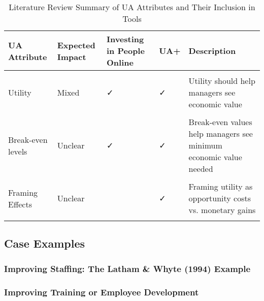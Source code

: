 \documentclass[
]{article}
\begin{document}
\begin{table}[!h]
\centering
\caption{\label{tab:literature-table}Literature Review Summary of UA Attributes and Their Inclusion in Tools}
\centering
\begin{tabular}[t]{lllll}
\toprule
UA Attribute & Expected Impact & Investing in People Online & UA+ & Description\\
\midrule
\cellcolor{gray!10}{Validity} & \cellcolor{gray!10}{Positive but weak} & \cellcolor{gray!10}{✓} & \cellcolor{gray!10}{✓} & \cellcolor{gray!10}{Validity should help managers see that practices work as claimed}\\
Utility & Mixed & ✓ & ✓ & Utility should help managers see economic value\\
\cellcolor{gray!10}{SDy} & \cellcolor{gray!10}{Mixed} & \cellcolor{gray!10}{✓} & \cellcolor{gray!10}{✓} & \cellcolor{gray!10}{SDy helps managers appreciate economic value of performance}\\
Break-even levels & Unclear & ✓ & ✓ & Break-even values help managers see minimum economic value needed\\
\cellcolor{gray!10}{Expectancy Charts} & \cellcolor{gray!10}{Mixed} & \cellcolor{gray!10}{} & \cellcolor{gray!10}{✓} & \cellcolor{gray!10}{Expectancy charts help managers see validity-probability relationships}\\
\addlinespace
Framing Effects & Unclear &  & ✓ & Framing utility as opportunity costs vs. monetary gains\\
\cellcolor{gray!10}{Plain-Text Descriptions} & \cellcolor{gray!10}{Positive} & \cellcolor{gray!10}{} & \cellcolor{gray!10}{✓} & \cellcolor{gray!10}{Plain-text descriptions improve comprehension}\\
\bottomrule
\end{tabular}
\end{table}

\subsection{Case Examples}\label{case-examples}

\subsubsection{Improving Staffing: The Latham \& Whyte (1994)
Example}\label{improving-staffing-the-latham-whyte-1994-example}

\subsubsection{Improving Training or Employee
Development}\label{improving-training-or-employee-development}
\end{document}
